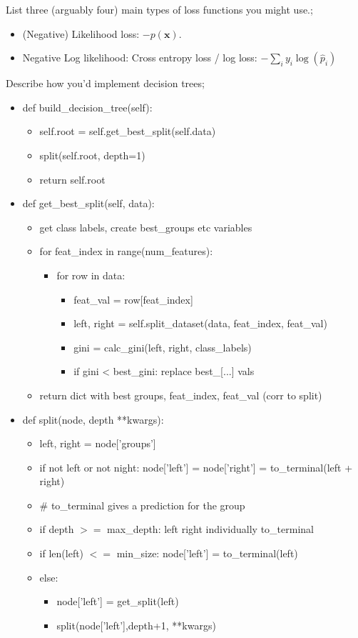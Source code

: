 \documentclass{article}
\begin{document}
List three (arguably four) main types of loss functions you might use.; \begin{itemize} \item (Negative) Likelihood loss: $-p(\mathbf{x})$. \item Negative Log likelihood: Cross entropy loss / log loss: $-\sum_i y_i\log(\hat{p}_i)$ \end{itemize}

Describe how you'd implement decision trees; \begin{itemize} \item def build\_decision\_tree(self): \begin{itemize} \item self.root = self.get\_best\_split(self.data) \item split(self.root, depth=1) \item return self.root \end{itemize} \item def get\_best\_split(self, data): \begin{itemize} \item get class labels, create best\_groups etc variables \item for feat\_index in range(num\_features):  \begin{itemize} \item for row in data: \begin{itemize} \item feat\_val = row[feat\_index] \item left, right = self.split\_dataset(data, feat\_index, feat\_val) \item gini = calc\_gini(left, right, class\_labels) \item if gini < best\_gini: replace best\_[...] vals \end{itemize} \end{itemize} \item return dict with best groups, feat\_index, feat\_val (corr to split) \end{itemize} \item def split(node, depth **kwargs): \begin{itemize} \item left, right = node['groups'] \item if not left or not night: node['left'] = node['right'] = to\_terminal(left + right) \item # to\_terminal gives a prediction for the group \item if depth $>=$ max\_depth: left right individually to\_terminal \item if len(left) $<=$ min\_size: node['left'] = to\_terminal(left) \item else:  \begin{itemize} \item node['left'] = get\_split(left) \item split(node['left'],depth+1, **kwargs) \end{itemize} \end{itemize} \end{itemize}
\end{document}
